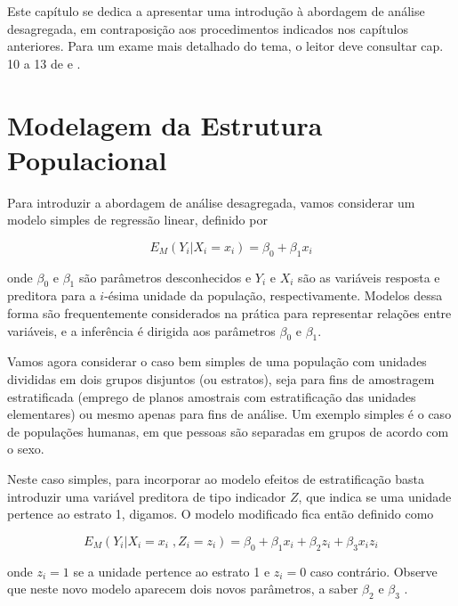 \documentclass[]{book}
\theoremstyle{definition}
\theoremstyle{definition}
\theoremstyle{definition}
\theoremstyle{remark}
\begin{document}
Este capítulo se dedica a apresentar uma introdução à abordagem de
análise desagregada, em contraposição aos procedimentos indicados nos
capítulos anteriores. Para um exame mais detalhado do tema, o leitor
deve consultar cap. 10 a 13 de \citep{Sk89a} e \citep{bryk}.

\section{Modelagem da Estrutura
Populacional}\label{modelagem-da-estrutura-populacional}

Para introduzir a abordagem de análise desagregada, vamos considerar um
modelo simples de regressão linear, definido por

\begin{equation}
E_{M}\left( Y_{i}\left| X_{i}=x_{i}\right. \right) =\beta _{0}+\beta
_{1}x_{i}  \label{eq:hier1}
\end{equation}

onde \(\beta _{0}\) e \(\beta _{1}\) são parâmetros desconhecidos e
\(Y_{i}\) e \(X_{i}\) são as variáveis resposta e preditora para a
\(i\)-ésima unidade da população, respectivamente. Modelos dessa forma
são frequentemente considerados na prática para representar relações
entre variáveis, e a inferência é dirigida aos parâmetros \(\beta _{0}\)
e \(\beta _{1}.\)

Vamos agora considerar o caso bem simples de uma população com unidades
divididas em dois grupos disjuntos (ou estratos), seja para fins de
amostragem estratificada (emprego de planos amostrais com estratificação
das unidades elementares) ou mesmo apenas para fins de análise. Um
exemplo simples é o caso de populações humanas, em que pessoas são
separadas em grupos de acordo com o sexo.

Neste caso simples, para incorporar ao modelo efeitos de estratificação
basta introduzir uma variável preditora de tipo indicador \(Z\), que
indica se uma unidade pertence ao estrato 1, digamos. O modelo
modificado fica então definido como

\begin{equation}
E_{M}\left( Y_{i}\left| X_{i}=x_{i}\;,Z_{i}=z_{i}\right. \right) =\beta
_{0}+\beta _{1}x_{i}+\beta _{2}z_{i}+\beta _{3}x_{i}z_{i}  \label{eq:hier2}
\end{equation}

onde \(z_{i}=1\) se a unidade pertence ao estrato 1 e \(z_{i}=0\) caso
contrário. Observe que neste novo modelo aparecem dois novos parâmetros,
a saber \(\beta _{2}\) e \(\beta _{3}\) .
\end{document}
